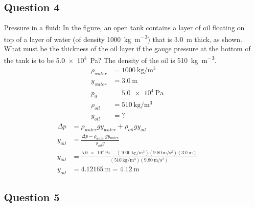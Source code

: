 \documentclass{article}
\begin{document}
\subsection{Question 4}

Pressure in a fluid: In the figure, an open tank contains a layer of oil floating on top of a layer of water (of density \SI{1000}{\kilogram \per \meter \cubed}) that is \SI{3.0}{\meter} thick, as shown. What must be the thickness of the oil layer if the gauge pressure at the bottom of the tank is to be \SI{5.0e4}{\pascal}? The density of the oil is \SI{510}{\kilogram \per \meter \cubed}.
\begin{align*}
	\rho_{water} & = \SI{1000}{\kilogram \per \meter \cubed} \\
	y_{water} & = \SI{3.0}{\meter} \\
	p_0 & = \SI{5.0e4}{\pascal} \\
	\rho_{oil} & = \SI{510}{\kilogram \per \meter \cubed} \\
	y_{oil} & = ?
\end{align*}
\begin{align*}
	\Delta p & = \rho_{water}gy_{water} + \rho_{oil}gy_{oil} \\
	y_{oil} & = \frac{ \Delta p - \rho_{water}gy_{water} }{ \rho_{oil}g } \\
	y_{oil} & = \frac{ \SI{5.0e4}{\pascal} - (\SI{1000}{\kilogram \per \meter \cubed})(\SI{9.80}{\meter \per \second \squared})(\SI{3.0}{\meter}) }{ (\SI{510}{\kilogram \per \meter \cubed})(\SI{9.80}{\meter \per \second \squared}) } \\
	y_{oil} & = \SI{4.12165}{\meter} = \SI{4.12}{\meter}
\end{align*}

\subsection{Question 5}
\end{document}
